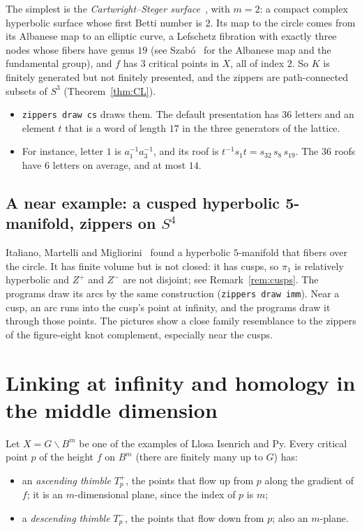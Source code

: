 \documentclass[11pt]{article}
\theoremstyle{remark}
\begin{document}
The simplest is the \emph{Cartwright--Steger surface}~\cite{CS}, with $m=2$: a compact complex hyperbolic surface whose
first Betti number is $2$. Its map to the circle comes from its Albanese map to an elliptic curve, a Lefschetz
fibration with exactly three nodes whose fibers have genus $19$ (see Szab\'o~\cite{Sz} for the Albanese map and the
fundamental group), and $f$ has $3$ critical points in $X$, all of index $2$. So $K$ is finitely generated but not finitely presented, and the zippers are
path-connected subsets of $S^3$ (Theorem~\ref{thm:CL}).
\begin{itemize}
\item \texttt{zippers draw cs} draws them. The default presentation has $36$ letters and an element $t$ that is a word of
length $17$ in the three generators of the lattice.
\item For instance, letter $1$ is $a_1^{-1}a_3^{-1}$, and its roof is $t^{-1}s_1t=s_{32}\,s_8\,s_{19}$. The $36$ roofs have
$6$ letters on average, and at most $14$.
\end{itemize}

\subsection{A near example: a cusped hyperbolic 5-manifold, zippers on $S^4$}

Italiano, Martelli and Migliorini~\cite{IMM} found a hyperbolic $5$-manifold that fibers over the circle. It has finite
volume but is not closed: it has cusps, so $\pi_1$ is relatively hyperbolic and $Z^+$ and $Z^-$ are not disjoint; see Remark~\ref{rem:cusps}.
The programs draw its arcs by the same construction (\texttt{zippers draw imm}). Near a cusp, an arc runs into the cusp's
point at infinity, and the programs draw it through those points. The pictures show a close family resemblance to the
zippers of the figure-eight knot complement, especially near the cusps.

\section{Linking at infinity and homology in the middle dimension}

Let $X=G\backslash B^m$ be one of the examples of Llosa Isenrich and Py. Every critical point $p$ of the height $f$ on
$B^m$ (there are finitely many up to $G$) has:
\begin{itemize}
\item an \emph{ascending thimble} $T^+_p$, the points that flow up from $p$ along the gradient of $f$; it is an
$m$-dimensional plane, since the index of $p$ is $m$;
\item a \emph{descending thimble} $T^-_p$, the points that flow down from $p$; also an $m$-plane.
\end{itemize}
\end{document}
